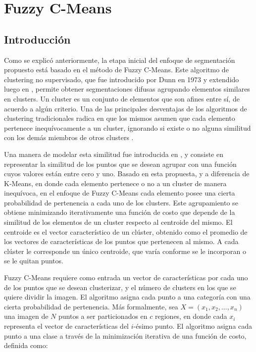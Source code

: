 \chapter{Fuzzy C-Means}
\section{Introducción}
\label{Introduccion}

Como se explicó anteriormente, la etapa inicial del enfoque de segmentación propuesto está basado en el método de Fuzzy C-Means. Este algoritmo de clustering no supervisado, que fue introducido por Dunn en 1973 \citep{dunn1973fuzzy} y extendido luego en \citep{bezdek1984fcm}, permite obtener segmentaciones difusas agrupando elementos similares en clusters. Un cluster es un conjunto de elementos que son afines entre sí, de acuerdo a algún criterio. Una de las principales desventajas de los algoritmos de clustering tradicionales radica en que los mismos asumen que cada elemento pertenece inequívocamente a un cluster, ignorando si existe o no alguna similitud con los demás miembros de otros clusters \citep{full1982fuzzy}.
 
Una manera de modelar esta similitud fue introducida en \citep{zadeh1965fuzzy}, y consiste en representar la similitud de los puntos que se desean agrupar con una función cuyos valores están entre cero y uno. Basado en esta propuesta, y a diferencia de K-Means, en donde cada elemento pertenece o no a un cluster de manera inequívoca, en el enfoque de Fuzzy C-Means cada elemento posee una cierta probabilidad de pertenencia a cada uno de los clusters. Este agrupamiento se obtiene minimizando iterativamente una función de costo que depende de la similitud de los elementos de un cluster respecto al centroide del mismo. El centroide es el vector característico de un clúster, obtenido como el promedio de los vectores de características de los puntos que pertenecen al mismo. A cada clúster le corresponde un único centroide, que varía conforme se le incorporan o se le quitan puntos.

Fuzzy C-Means requiere como entrada un vector de características por cada uno de los puntos que se desean clusterizar, y el número de clusters en los que se quiere dividir la imagen. El algoritmo asigna cada punto a una categoría con una cierta probabilidad de pertenencia. Más formalmente, sea $ X = (x_1, x_2, ..., x_n)$ una imagen de $N$ puntos a ser particionados en $c$ regiones, en donde cada $x_i$ representa el vector de características del $i$-ésimo punto. El algoritmo asigna cada punto a una clase a través de la minimización iterativa de una función de costo, definida como:

